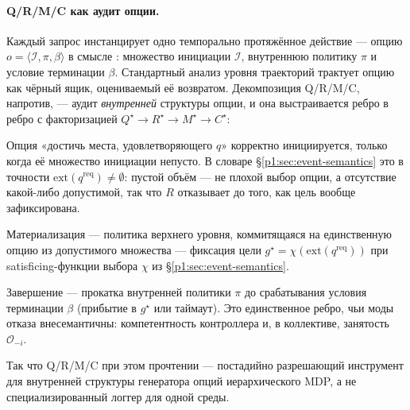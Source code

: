 \documentclass{article}
\begin{document}
\paragraph{Q/R/M/C как аудит опции.}
Каждый запрос инстанцирует одно темпорально протяжённое действие --- опцию
$o=\langle \mathcal{I},\pi,\beta\rangle$ в смысле
\citet{sutton1999between}: множество инициации $\mathcal{I}$, внутреннюю
политику $\pi$ и условие терминации $\beta$. Стандартный
анализ уровня траекторий трактует опцию как чёрный ящик, оцениваемый её
возвратом. Декомпозиция Q/R/M/C, напротив, --- аудит \emph{внутренней}
структуры опции, и она выстраивается ребро в ребро с
факторизацией $Q^\star\!\rightarrow\!R^\star\!\rightarrow\!M^\star\!\rightarrow\!C^\star$:
\begin{description}[leftmargin=14pt,topsep=2pt,itemsep=2pt]
\item[$Q^\star\!\rightarrow\!R^\star$ (инициация).] Опция «достичь места, удовлетворяющего $q$» корректно инициируется, только когда её множество инициации непусто. В словаре \S\ref{p1:sec:event-semantics} это в точности $\mathrm{ext}(q^{\mathrm{req}})\neq\emptyset$: пустой объём --- не плохой выбор опции, а отсутствие какой-либо допустимой, так что $R$ отказывает до того, как цель вообще зафиксирована.
\item[$R^\star\!\rightarrow\!M^\star$ (политика над опциями).] Материализация --- политика верхнего уровня, коммитящаяся на единственную опцию из допустимого множества --- фиксация цели $g^\star=\chi(\mathrm{ext}(q^{\mathrm{req}}))$ при satisficing-функции выбора $\chi$ из \S\ref{p1:sec:event-semantics}.
\item[$M^\star\!\rightarrow\!C^\star$ (исполнение до терминации).] Завершение --- прокатка внутренней политики $\pi$ до срабатывания условия терминации $\beta$ (прибытие в $g^\star$ или таймаут). Это единственное ребро, чьи моды отказа внесемантичны: компетентность контроллера и, в коллективе, занятость $\mathcal{O}_{-i}$.
\end{description}
Так что Q/R/M/C при этом прочтении --- постадийно разрешающий инструмент для
внутренней структуры генератора опций иерархического MDP, а не
специализированный логгер для одной среды.
\end{document}

